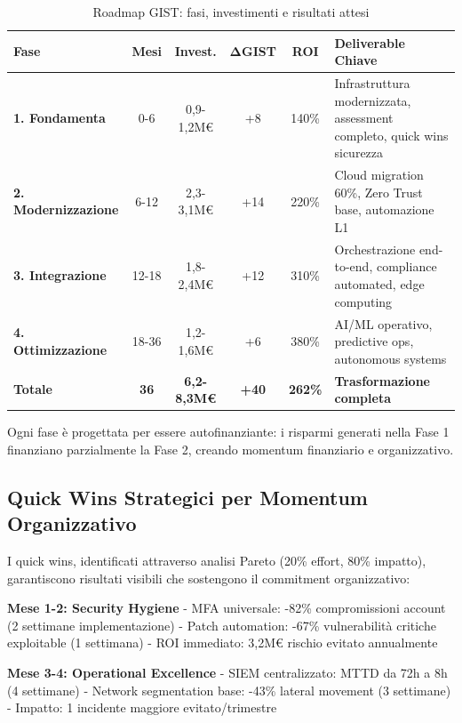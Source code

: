 \begin{table}[htbp]
\centering
\caption{Roadmap GIST: fasi, investimenti e risultati attesi}
\label{tab:roadmap_detailed}
\begin{tabular}{@{}p{2.5cm}ccccp{4cm}@{}}
\toprule
\textbf{Fase} & \textbf{Mesi} & \textbf{Invest.} & \textbf{ΔGIST} & \textbf{ROI} & \textbf{Deliverable Chiave} \\
\midrule
\rowcolor{blue!5}
\textbf{1. Fondamenta} & 0-6 & 0,9-1,2M€ & +8 & 140\% & Infrastruttura modernizzata, assessment completo, quick wins sicurezza \\
\rowcolor{green!5}
\textbf{2. Modernizzazione} & 6-12 & 2,3-3,1M€ & +14 & 220\% & Cloud migration 60\%, Zero Trust base, automazione L1 \\
\rowcolor{yellow!5}
\textbf{3. Integrazione} & 12-18 & 1,8-2,4M€ & +12 & 310\% & Orchestrazione end-to-end, compliance automated, edge computing \\
\rowcolor{orange!5}
\textbf{4. Ottimizzazione} & 18-36 & 1,2-1,6M€ & +6 & 380\% & AI/ML operativo, predictive ops, autonomous systems \\
\midrule
\textbf{Totale} & \textbf{36} & \textbf{6,2-8,3M€} & \textbf{+40} & \textbf{262\%} & \textbf{Trasformazione completa} \\
\bottomrule
\end{tabular}
\end{table}

Ogni fase è progettata per essere autofinanziante: i risparmi generati nella Fase 1 finanziano parzialmente la Fase 2, creando momentum finanziario e organizzativo.

\subsection{\texorpdfstring{Quick Wins Strategici per Momentum Organizzativo}{5.4.2 - Quick Wins}}
\label{subsec:5.4.2}

I quick wins, identificati attraverso analisi Pareto (20\% effort, 80\% impatto), garantiscono risultati visibili che sostengono il commitment organizzativo:

\textbf{Mese 1-2: Security Hygiene}
- MFA universale: -82\% compromissioni account (2 settimane implementazione)
- Patch automation: -67\% vulnerabilità critiche exploitable (1 settimana)
- ROI immediato: 3,2M€ rischio evitato annualmente

\textbf{Mese 3-4: Operational Excellence}
- SIEM centralizzato: MTTD da 72h a 8h (4 settimane)
- Network segmentation base: -43\% lateral movement (3 settimane)
- Impatto: 1 incidente maggiore evitato/trimestre

